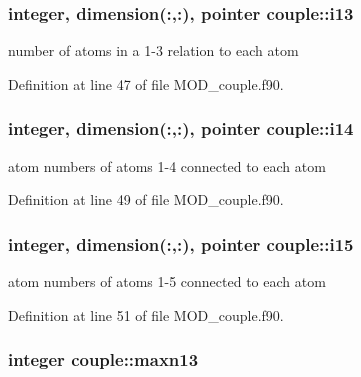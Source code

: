 \hypertarget{classcouple_a9b19aea8f00763cc5b1c18a7b5de63d1}{
\subsubsection[{i13}]{\setlength{\rightskip}{0pt plus 5cm}integer, dimension(\-:,\-:), pointer couple\-::i13}}\label{classcouple_a9b19aea8f00763cc5b1c18a7b5de63d1}


number of atoms in a 1-\/3 relation to each atom 



Definition at line 47 of file M\-O\-D\-\_\-couple.\-f90.

\hypertarget{classcouple_a6774efb08882de858d0b9487266ea2b3}{
\subsubsection[{i14}]{\setlength{\rightskip}{0pt plus 5cm}integer, dimension(\-:,\-:), pointer couple\-::i14}}\label{classcouple_a6774efb08882de858d0b9487266ea2b3}


atom numbers of atoms 1-\/4 connected to each atom 



Definition at line 49 of file M\-O\-D\-\_\-couple.\-f90.

\hypertarget{classcouple_a01bb6634975b896380ca729756015a11}{
\subsubsection[{i15}]{\setlength{\rightskip}{0pt plus 5cm}integer, dimension(\-:,\-:), pointer couple\-::i15}}\label{classcouple_a01bb6634975b896380ca729756015a11}


atom numbers of atoms 1-\/5 connected to each atom 



Definition at line 51 of file M\-O\-D\-\_\-couple.\-f90.

\hypertarget{classcouple_a55c701f41c3dfc521a4d81f8a9fd2428}{
\subsubsection[{maxn13}]{\setlength{\rightskip}{0pt plus 5cm}integer couple\-::maxn13}}\label{classcouple_a55c701f41c3dfc521a4d81f8a9fd2428}


